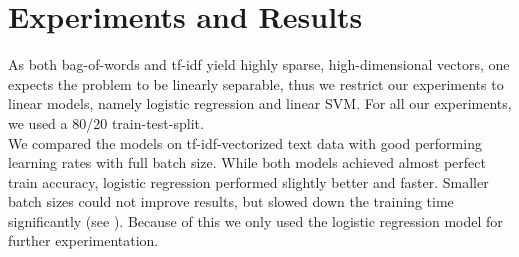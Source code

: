 \documentclass[10pt]{article}
\begin{document}
	\section{Experiments and Results}
	As both bag-of-words and tf-idf yield highly sparse, high-dimensional vectors, one expects the problem to be linearly separable, thus we restrict our experiments to linear models, namely logistic regression and linear SVM. For all our experiments, we used a 80/20 train-test-split.\\
	
	We compared the models on tf-idf-vectorized text data with good performing learning rates with full batch size. While both models achieved almost perfect train accuracy, logistic regression performed slightly better and faster. Smaller batch sizes could not improve results, but slowed down the training time significantly (see ). Because of this we only used the logistic regression model for further experimentation. 
	
	
\end{document}
